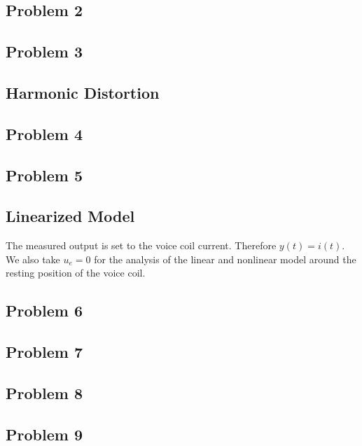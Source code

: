 \documentclass[12pt,a4paper,fleqn, onesside]{report}
\begin{document}
\subsection*{Problem 2}

\subsection*{Problem 3}


\subsection{Harmonic Distortion}
\subsection*{Problem 4}

\subsection*{Problem 5}


\subsection{Linearized Model}
The measured output is set to the voice coil current. Therefore $y(t) = i(t)$.
We also take $u_{e} = 0$ for the analysis of the linear and nonlinear model around the resting position of the voice coil. 

\subsection*{Problem 6}


\subsection*{Problem 7}


\subsection*{Problem 8}


\subsection*{Problem 9}

\end{document}
